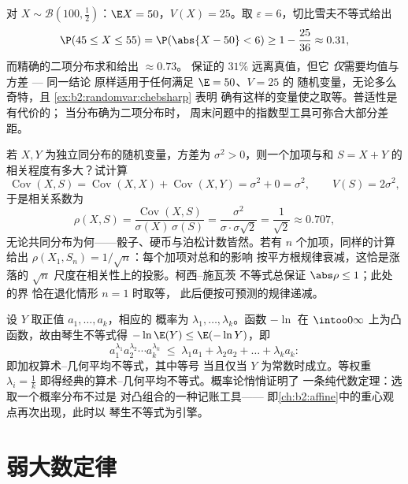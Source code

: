 \begin{example}[切比雪夫不等式用于一百次
抛掷]\label{ex:b2:randomvar:hundredtosses}
对 $X \sim \mathcal B(100, \frac12)$：$\E X = 50$，$V(X) =
25$。取 $\varepsilon = 6$，切比雪夫不等式给出
\[
\P(45 \leq X \leq 55) = \P(\abs{X - 50} < 6)
\geq 1 - \frac{25}{36} \approx 0.31 ,
\]
而精确的二项分布求和给出 $\approx 0.73$。
保证的 $31\%$ 远离真值，但它
\emph{仅}需要均值与方差 --- 同一结论
原样适用于任何满足 $\E = 50$、$V = 25$ 的
随机变量，无论多么奇特，且 \cref{ex:b2:randomvar:chebsharp} 表明
确有这样的变量使之取等。普适性是有代价的；
当分布确为二项分布时，
周末问题中的指数型工具可弥合大部分差距。
\end{example}

\begin{example}\label{ex:b2:randomvar:partwhole}
若 $X, Y$ 为独立同分布的随机变量，方差为
$\sigma^2 > 0$，则一个加项与和
$S = X + Y$ 的相关程度有多大？试计算
\[
\operatorname{Cov}(X, S) = \operatorname{Cov}(X, X) +
\operatorname{Cov}(X, Y) = \sigma^2 + 0 = \sigma^2,
\qquad V(S) = 2\sigma^2,
\]
于是相关系数为
\[
\rho(X, S) = \frac{\operatorname{Cov}(X,
S)}{\sigma(X)\,\sigma(S)}
= \frac{\sigma^2}{\sigma\cdot\sigma\sqrt2}
= \frac{1}{\sqrt2} \approx 0.707 ,
\]
无论共同分布为何——骰子、硬币与泊松计数皆然。若有
$n$ 个加项，同样的计算给出 $\rho(X_1, S_n) =
1/\sqrt n$：每个加项对总和的影响
按平方根规律衰减，这恰是涨落的
$\sqrt n$ 尺度在相关性上的投影。柯西–施瓦茨
不等式总保证 $\abs\rho \leq 1$；此处的界
恰在退化情形 $n = 1$ 时取等，
此后便按可预测的规律递减。
\end{example}

\begin{example}\label{ex:b2:randomvar:amgm}
设 $Y$ 取正值 $a_1, \dots, a_k$，相应的
概率为 $\lambda_1, \dots, \lambda_k$。函数
$-\ln$ 在 $\intoo0\infty$ 上为凸函数，故由琴生不等式得
$-\ln\E(Y) \leq \E(-\ln Y)$，即
\[
a_1^{\lambda_1}a_2^{\lambda_2}\cdots a_k^{\lambda_k}
\;\leq\; \lambda_1a_1 + \lambda_2a_2 + \dots + \lambda_ka_k :
\]
即加权算术–几何平均不等式，其中等号
当且仅当 $Y$ 为常数时成立。等权重 $\lambda_i = \frac1k$
即得经典的算术–几何平均不等式。概率论悄悄证明了
一条纯代数定理：选取一个概率分布不过是
对凸组合的一种记账工具——
即\cref{ch:b2:affine}中的重心观点再次出现，此时以
琴生不等式为引擎。
\end{example}

\section{弱大数定律}

